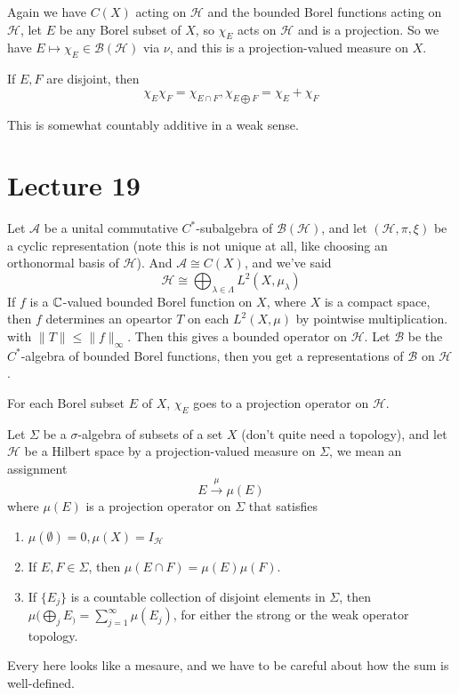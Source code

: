 Again we have $C(X)$ acting on $\mathcal{H}$ and the bounded Borel functions acting on $\mathcal{H}$, let $E$ be any Borel subset of $X$, so $\chi_E$ acts on $\mathcal{H}$ and is a projection. So we have $E\mapsto \chi_E\in\mathcal{B}(\mathcal{H})$ via $\nu$, and this is a projection-valued measure on $X$. 

If $E, F$ are disjoint, then
\begin{equation*}
    \chi_E\chi_F=\chi_{E\cap F}, \chi_{E\bigoplus F}=\chi_E+\chi_F
\end{equation*}
\begin{remark}
    This is somewhat countably additive in a weak sense.
\end{remark}

\section{Lecture 19}
Let $\mathcal{A}$ be a unital commutative $C^*$-subalgebra of $\mathcal{B}(\mathcal{H})$, and let $(\mathcal{H}, \pi, \xi)$ be a cyclic representation (note this is not unique at all, like choosing an orthonormal basis of $\mathcal{H}$). And $\mathcal{A}\cong C(X)$, and we've said
\begin{equation*}
    \mathcal{H}\cong\bigoplus_{\lambda\in\Lambda}L^2(X, \mu_\lambda)
\end{equation*}
If $f$ is a $\mathbb{C}$-valued bounded Borel function on $X$, where $X$ is a compact space, then $f$ determines an opeartor $T$ on each $L^2(X,\mu)$ by pointwise multiplication. with $\|T\|\leq\|f\|_\infty$. Then this gives a bounded operator on $\mathcal{H}$. Let $\mathcal{B}$ be the $C^*$-algebra of bounded Borel functions, then you get a representations of $\mathcal{B}$ on $\mathcal{H}$.

For each Borel subset $E$ of $X$, $\chi_E$ goes to a projection operator on $\mathcal{H}$.
\begin{definition}
    Let $\Sigma$ be a $\sigma$-algebra of subsets of a set $X$ (don't quite need a topology), and let $\mathcal{H}$ be a Hilbert space by a projection-valued measure on $\Sigma$, we mean an assignment 
    \begin{equation*}
        E\xrightarrow{\mu}\mu(E)
    \end{equation*}
    where $\mu(E)$ is a projection operator on $\Sigma$ that satisfies
    \begin{enumerate}
        \item $\mu(\emptyset)=0, \mu(X)=I_\mathcal{H}$ 
        \item If $E, F\in\Sigma$, then $\mu(E\cap F)=\mu(E)\mu(F)$.
        \item If $\{E_j\}$ is a countable collection of disjoint elements in $\Sigma$, then $\mu(\bigoplus_j E_)=\sum_{j=1}^\infty\mu(E_j)$, for either the strong or the weak operator topology.
    \end{enumerate}
\end{definition}
\begin{note}
    Every here looks like a mesaure, and we have to be careful about how the sum is well-defined.
\end{note}

